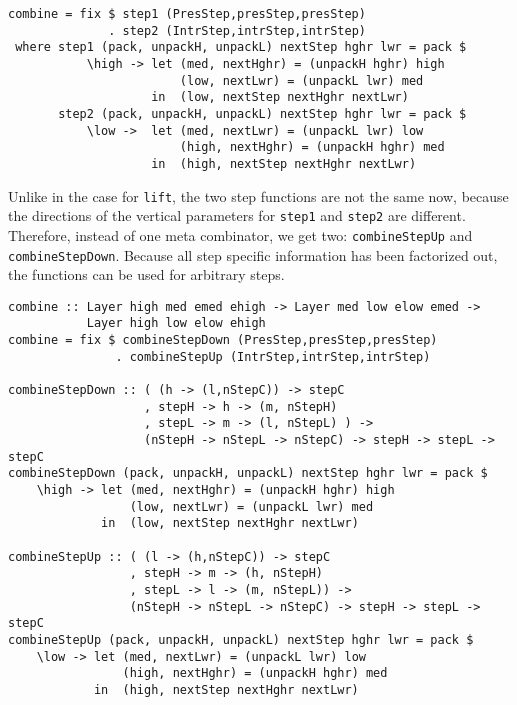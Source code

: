 \begin{small}
\begin{verbatim}
combine = fix $ step1 (PresStep,presStep,presStep) 
              . step2 (IntrStep,intrStep,intrStep) 
 where step1 (pack, unpackH, unpackL) nextStep hghr lwr = pack $
           \high -> let (med, nextHghr) = (unpackH hghr) high
                        (low, nextLwr) = (unpackL lwr) med
                    in  (low, nextStep nextHghr nextLwr)
       step2 (pack, unpackH, unpackL) nextStep hghr lwr = pack $
           \low ->  let (med, nextLwr) = (unpackL lwr) low
                        (high, nextHghr) = (unpackH hghr) med
                    in  (high, nextStep nextHghr nextLwr)
\end{verbatim}
\end{small}

Unlike in the case for \texttt{lift}, the two step functions are not the same now, because the directions of the vertical parameters for \texttt{step1} and \texttt{step2} are different. Therefore, instead of one meta combinator, we get two: \texttt{combineStepUp} and \texttt{combineStepDown}. Because all step specific information has been factorized out, the functions can be used for arbitrary steps.

\begin{small}
\begin{verbatim}
combine :: Layer high med emed ehigh -> Layer med low elow emed -> 
           Layer high low elow ehigh
combine = fix $ combineStepDown (PresStep,presStep,presStep) 
               . combineStepUp (IntrStep,intrStep,intrStep) 

combineStepDown :: ( (h -> (l,nStepC)) -> stepC 
                   , stepH -> h -> (m, nStepH)
                   , stepL -> m -> (l, nStepL) ) -> 
                   (nStepH -> nStepL -> nStepC) -> stepH -> stepL -> stepC
combineStepDown (pack, unpackH, unpackL) nextStep hghr lwr = pack $
    \high -> let (med, nextHghr) = (unpackH hghr) high
                 (low, nextLwr) = (unpackL lwr) med
             in  (low, nextStep nextHghr nextLwr)

combineStepUp :: ( (l -> (h,nStepC)) -> stepC 
                 , stepH -> m -> (h, nStepH)
                 , stepL -> l -> (m, nStepL)) -> 
                 (nStepH -> nStepL -> nStepC) -> stepH -> stepL -> stepC
combineStepUp (pack, unpackH, unpackL) nextStep hghr lwr = pack $
    \low -> let (med, nextLwr) = (unpackL lwr) low
                (high, nextHghr) = (unpackH hghr) med
            in  (high, nextStep nextHghr nextLwr)
\end{verbatim}
\end{small}

